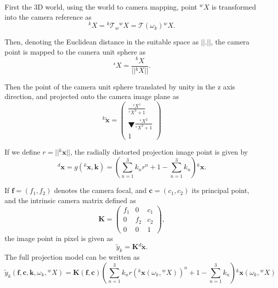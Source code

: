 \documentclass{article}
\begin{document}
First the 3D world, using the world to camera mapping, point ${}^wX$ is transformed into the camera reference as 
$${}^kX={}^k\mathcal{T}_w {}^wX =\mathcal{T}(\omega_k) {}^wX.$$

Then, denoting the Euclidean distance in the suitable space  as $||.||$, the camera point is mapped to the camera unit sphere as 
$${}^sX = \frac{{}^kX}{||{}^kX||}.$$

Then the point of the camera unit sphere translated by unity in the z axis direction, and projected onto the camera image plane as 
$$
{}^k\tilde{\mathbf{x}} = 
\left(
\begin{array}{c}
\frac{{}^sX^1}{{}^sX^3+1}\\▼
\frac{{}^sX^2}{{}^sX^3+1}\\
1
\end{array}
\right)
$$

If we define $r = ||{}^k \mathbf{x}||$,  the radially distorted projection image point is given by
$$ {}^d \mathbf{x} = g({}^k \mathbf{x}, \mathbf{k}) = \left(\sum_{n=1}^3 k_n r^n + 1 - \sum_{n=1}^3 k_n \right) {}^k \mathbf{x}.$$

If $\mathbf{f}=(f_1,f_2)$ denotes the camera focal, and $\mathbf{c}=(c_1,c_2)$ its principal point, and the intrinsic camera matrix defined as 
$$
\mathbf{K} =
\left(
\begin{array}{ccc}
f_1 & 0   & c_1\\
0   & f_2 & c_2\\
0   & 0   & 1
\end{array}
\right), 
$$
the image point in pixel is given as
$$
\tilde{y}_k = \mathbf{K} {}^d \tilde{\mathbf{x}}.
$$
%
The full projection model can be written as
$$
\tilde{y}_k(\mathbf{f},\mathbf{c},\mathbf{k},\omega_k,{}^wX) = \mathbf{K}(\mathbf{f},\mathbf{c}) \left(\sum_{n=1}^3 k_n r({}^k \mathbf{x}(\omega_k,{}^wX))^n + 1 - \sum_{n=1}^3 k_n \right) {}^k \mathbf{x}(\omega_k,{}^wX)
$$



\end{document}
